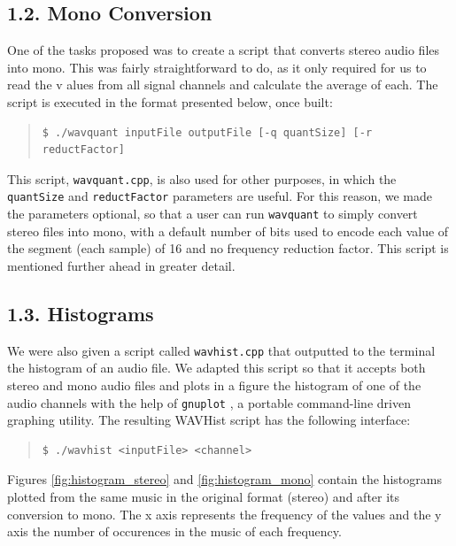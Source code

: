 \documentclass[12pt]{article}
\begin{document}
\subsection*{1.2. Mono Conversion}

One of the tasks proposed was to create a script that converts stereo audio 
files into mono.
This was fairly straightforward to do, as it only required for us to read the v
alues from all signal channels and calculate the average of each.
The script is executed in the format presented below, once built:

\begingroup
\addtolength\leftmargini{-0.4in}
\begin{quote}
\begin{verbatim}
$ ./wavquant inputFile outputFile [-q quantSize] [-r reductFactor]
\end{verbatim}
\end{quote}
\endgroup

This script, \texttt{wavquant.cpp}, is also used for other purposes, in which 
the \texttt{quantSize} and \texttt{reductFactor} parameters are useful.
For this reason, we made the parameters optional, so that a user can run 
\texttt{wavquant} to simply convert stereo files into mono, with a default 
number of bits used to encode each value of the segment (each sample) of 16 and 
no frequency reduction factor.
This script is mentioned further ahead in greater detail.

\subsection*{1.3. Histograms}

We were also given a script called \texttt{wavhist.cpp} that outputted to the 
terminal the histogram of an audio file.
We adapted this script so that it accepts both stereo and mono audio files 
and plots in a figure the histogram of one of the audio channels with the help of \texttt{gnuplot} \cite{gnuplot}, a portable command-line driven graphing utility. The resulting WAVHist script has the following interface:

\begingroup
\addtolength\leftmargini{-0.4in}
\begin{quote}
\begin{verbatim}
$ ./wavhist <inputFile> <channel>
\end{verbatim}
\end{quote}
\endgroup

Figures \ref{fig:histogram_stereo} and \ref{fig:histogram_mono} contain the 
histograms plotted from the same music in the original format (stereo) and after 
its conversion to mono. 
The x axis represents the frequency of the values and the y axis the number of 
occurences in the music of each frequency.
\end{document}
